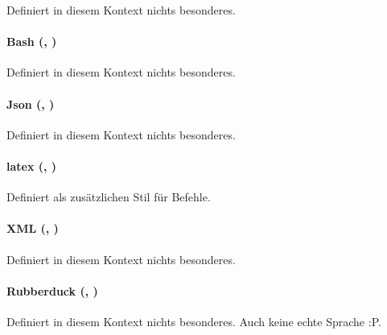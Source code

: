 \documentclass{sopra-base}
\begin{document}
Definiert in diesem Kontext nichts besonderes.

\paragraph{Bash (, )}

Definiert in diesem Kontext nichts besonderes.

\paragraph{Json (, )}

Definiert in diesem Kontext nichts besonderes.

\paragraph{latex (, )}

Definiert  als zusätzlichen Stil für Befehle.

\paragraph{XML (, )}

Definiert in diesem Kontext nichts besonderes.

\paragraph{Rubberduck (, )}

Definiert in diesem Kontext nichts besonderes. Auch keine echte Sprache :P.
\end{document}
